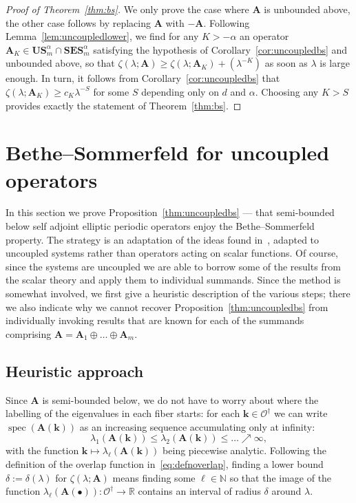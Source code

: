 \documentclass[10pt]{amsart}
\theoremstyle{definition}\newtheorem{defi}[theo]{Definition}\newtheorem{rema}[theo]{Remark}\newtheorem{exam}[theo]{Example}\newtheorem{nota}[theo]{Notation}
\DeclareMathOperator{\spec}{spec}
\newcommand{\R}{\mathbb R}
\newcommand{\N}{\mathbb N}
\newcommand{\CO}{\mathcal{O}}
\newcommand{\BA}{\mathbf A}
\newcommand{\BE}{\mathbf E}
\newcommand{\BS}{\mathbf S}
\newcommand{\BU}{\mathbf U}
\newcommand{\bk}{\mathbf k}
\begin{document}
\begin{proof}[Proof of Theorem~\ref{thm:bs}]
We only prove the case where $\BA$ is unbounded above, the other case follows by replacing $\BA$ with $-\BA$. Following Lemma~\ref{lem:uncoupledlower}, we find for any $K > - \alpha$ an operator $\BA_K \in \BU\BS^\alpha_m \cap
\BS\BE\BS_m^\alpha$ satisfying the hypothesis of Corollary~\ref{cor:uncoupledbs} and unbounded above, so that $\zeta(\lambda;\BA) \ge
\zeta(\lambda;\BA_K) + (\lambda^{-K})$ as soon as $\lambda$ is large enough. In turn, it follows from Corollary~\ref{cor:uncoupledbs} that $\zeta(\lambda;\BA_K) \ge c_K \lambda^{-S}$ for some $S$ depending only on $d$ and $\alpha$. Choosing any $K > S$ provides exactly the statement of Theorem~\ref{thm:bs}.
\end{proof}



\section{Bethe--Sommerfeld for uncoupled operators} \label{sec:cg}

In this section we prove Proposition~\ref{thm:uncoupledbs} --- that semi-bounded below self adjoint elliptic periodic operators enjoy the Bethe--Sommerfeld property. The strategy is an adaptation of the ideas found in~\cite{barbpar,parnovski,ParSob2010}, adapted to uncoupled systems rather than operators acting on scalar functions. Of course, since the systems are uncoupled we are able to borrow some of the results from the scalar theory and apply them to individual summands. Since the method is somewhat involved, we first give a heuristic description of the various steps; there we also indicate why we cannot recover Proposition~\ref{thm:uncoupledbs} from individually invoking results that are known for each of the summands comprising $\BA = \BA_1
\oplus \dotso \oplus \BA_m$.

\subsection{Heuristic approach}

Since $\BA$ is semi-bounded below, we do not have to worry about where the labelling of the eigenvalues in each fiber starts: for each $\bk \in \CO^\dagger$ we can write $\spec(\BA(\bk))$ as an increasing sequence accumulating only at infinity:
\begin{equation}
\lambda_1(\BA(\bk)) \le \lambda_2(\BA(\bk)) \le \dotso \nearrow \infty,
\end{equation}
with the function $\bk \mapsto \lambda_\ell(\BA(\bk))$ being piecewise analytic. Following the definition of the overlap function in~\eqref{eq:defnoverlap}, finding a lower bound $\delta := \delta(\lambda)$ for $\zeta(\lambda;\BA)$ means finding some $\ell \in \N$ so that the image of the function $\lambda_\ell(\BA(\bullet)) : \CO^\dagger \to \R$ contains an interval of radius $\delta$ around $\lambda$.
\end{document}
